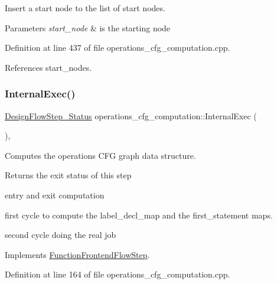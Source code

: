 Insert a start node to the list of start nodes. 


\begin{DoxyParams}{Parameters}
{\em start\+\_\+node} & is the starting node \\
\hline
\end{DoxyParams}


Definition at line 437 of file operations\+\_\+cfg\+\_\+computation.\+cpp.



References start\+\_\+nodes.

\mbox{\label{classoperations__cfg__computation_a5ab48f4fbba150d484e99c36c352bfad}} 
\subsubsection{\texorpdfstring{Internal\+Exec()}{InternalExec()}}
{\footnotesize\ttfamily \hyperlink{design__flow__step_8hpp_afb1f0d73069c26076b8d31dbc8ebecdf}{Design\+Flow\+Step\+\_\+\+Status} operations\+\_\+cfg\+\_\+computation\+::\+Internal\+Exec (\begin{DoxyParamCaption}{ }\end{DoxyParamCaption})\hspace{0.3cm}{\ttfamily [override]}, {\ttfamily [virtual]}}



Computes the operations C\+FG graph data structure. 

\begin{DoxyReturn}{Returns}
the exit status of this step 
\end{DoxyReturn}
entry and exit computation

first cycle to compute the label\+\_\+decl\+\_\+map and the first\+\_\+statement maps.

second cycle doing the real job 

Implements \hyperlink{classFunctionFrontendFlowStep_a00612f7fb9eabbbc8ee7e39d34e5ac68}{Function\+Frontend\+Flow\+Step}.



Definition at line 164 of file operations\+\_\+cfg\+\_\+computation.\+cpp.



